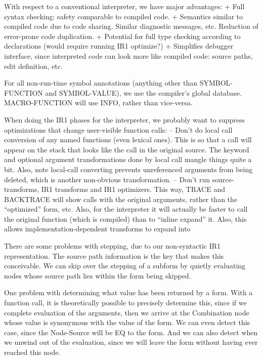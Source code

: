 With respect to a conventional interpreter, we have major advantages:
 + Full syntax checking: safety comparable to compiled code.
 + Semantics similar to compiled code due to code sharing.  Similar diagnostic
   messages, etc.  Reduction of error-prone code duplication.
 + Potential for full type checking according to declarations (would require
   running IR1 optimize?)
 + Simplifies debugger interface, since interpreted code can look more like
   compiled code: source paths, edit definition, etc.

For all non-run-time symbol annotations (anything other than SYMBOL-FUNCTION
and SYMBOL-VALUE), we use the compiler's global database.  MACRO-FUNCTION will
use INFO, rather than vice-versa.

When doing the IR1 phases for the interpreter, we probably want to suppress
optimizations that change user-visible function calls:
 -- Don't do local call conversion of any named functions (even lexical ones).
    This is so that a call will appear on the stack that looks like the call in
    the original source.  The keyword and optional argument transformations
    done by local call mangle things quite a bit.  Also, note local-call
    converting prevents unreferenced arguments from being deleted, which is
    another non-obvious transformation.
 -- Don't run source-transforms, IR1 transforms and IR1 optimizers.  This way,
    TRACE and BACKTRACE will show calls with the original arguments, rather
    than the ``optimized'' form, etc.  Also, for the interpreter it will
    actually be faster to call the original function (which is compiled) than
    to ``inline expand'' it.  Also, this allows implementation-dependent
    transforms to expand into %

There are some problems with stepping, due to our non-syntactic IR1
representation.  The source path information is the key that makes this
conceivable.  We can skip over the stepping of a subform by quietly evaluating
nodes whose source path lies within the form being skipped.

One problem with determining what value has been returned by a form.  With a
function call, it is theoretically possible to precisely determine this, since
if we complete evaluation of the arguments, then we arrive at the Combination
node whose value is synonymous with the value of the form.  We can even detect
this case, since the Node-Source will be EQ to the form.  And we can also
detect when we unwind out of the evaluation, since we will leave the form
without having ever reached this node.

